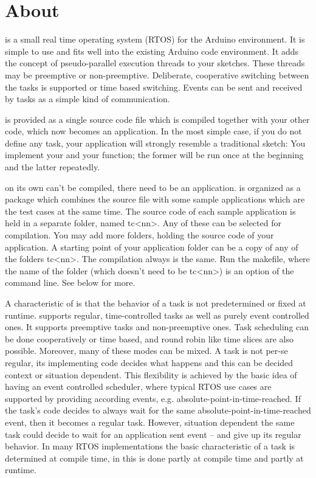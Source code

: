 \chapter{About \rtos{}}
\label{secAbout}

\rtos{} is a small real time operating system (RTOS) for the Arduino
environment. It is simple to use and fits well into the existing Arduino
code environment. It adds the concept of pseudo-parallel execution threads
to your sketches. These threads may be preemptive or non-preemptive.
Deliberate, cooperative switching between the tasks is supported or time
based switching. Events can be sent and received by tasks as a simple kind
of communication.

\rtos{} is provided as a single source code file which is compiled together
with your other code, which now becomes an \rtos{} application. In the most
simple case, if you do not define any task, your application will strongly
resemble a traditional sketch: You implement your  and your
 function; the former will be run once at the beginning and
the latter repeatedly.

\rtos{} on its own can't be compiled, there need to be an application.
\rtos{} is organized as a package which combines the \rtos{} source file
with some sample applications which are the test cases at the same time.
The source code of each sample application is held in a separate folder,
named tc\textless nn\textgreater. Any of these can be selected for
compilation. You may add more folders, holding the source code of your
\rtos{} application. A starting point of your application folder can be a
copy of any of the folders tc\textless nn\textgreater. The compilation
always is the same. Run the makefile, where the name of the folder (which
doesn't need to be tc\textless nn\textgreater) is an option of the
command line. See below for more.

A characteristic of \rtos{} is that the behavior of a task is not
predetermined or fixed at runtime. \rtos{} supports regular,
time-controlled tasks as well as purely event controlled ones. It supports
preemptive tasks and non-preemptive ones. Task scheduling can be done
cooperatively or time based, and round robin like time slices are also
possible. Moreover, many of these modes can be mixed. A task is not per-se
regular, its implementing code decides what happens and this can be
decided context or situation dependent. This flexibility is achieved by
the basic idea of having an event controlled scheduler, where typical RTOS
use cases are supported by providing according events, e.g.
absolute-point-in-time-reached. If the task's code decides to always wait
for the same absolute-point-in-time-reached event, then it becomes a
regular task. However, situation dependent the same task could decide to
wait for an application sent event -- and give up its regular behavior. In
many RTOS implementations the basic characteristic of a task is determined
at compile time, in \rtos{} this is done partly at compile time and partly
at runtime.

